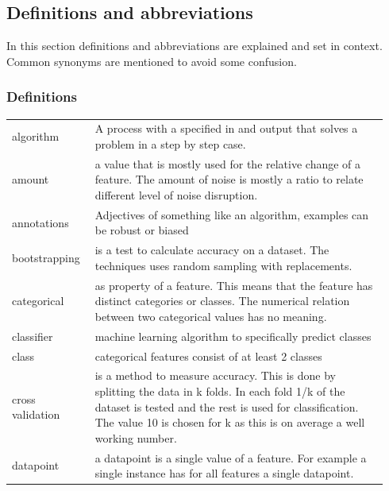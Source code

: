 \documentclass[a4paper,10pt]{article}
\begin{document}
\subsection{Definitions and abbreviations}
In this section definitions and abbreviations are explained and set in context. Common synonyms are mentioned to avoid some confusion.
\subsubsection{Definitions}

\begin{tabular}{ p{0.20\linewidth} p{0.7437\linewidth} }
	
	algorithm & A process with a specified in and output that solves a problem in a step by step case.\\ [1ex]
	
	amount & a value that is mostly used for the relative change of a feature. The amount of noise is mostly a ratio to relate different level of noise disruption. \\[1ex]	
	
	annotations & Adjectives of something like an algorithm, examples can be robust or biased\\ [1ex]
	
	bootstrapping & is a test to calculate accuracy on a dataset. The techniques uses random sampling with replacements.  \\ [1ex]
	
	categorical & as property of a feature. This means that the feature has distinct categories or classes. The numerical relation between two categorical values has no meaning. \\ [1ex]
	
	classifier & machine learning algorithm to specifically predict classes \\ [1ex]
	
	class	 & categorical features consist of at least 2 classes\\ [1ex]
	
	cross validation & is a method to measure accuracy. This is done by splitting the data in k folds. In each fold 1/k of the dataset is tested and the rest is used for classification. The value 10 is chosen for k as this is on average a well working number\cite{Cross}. \\ [1ex]
	
	datapoint & a datapoint is a single value of a feature. For example a single instance has for all features a single datapoint.\\[1ex]
	

\end{tabular}
\end{document}

